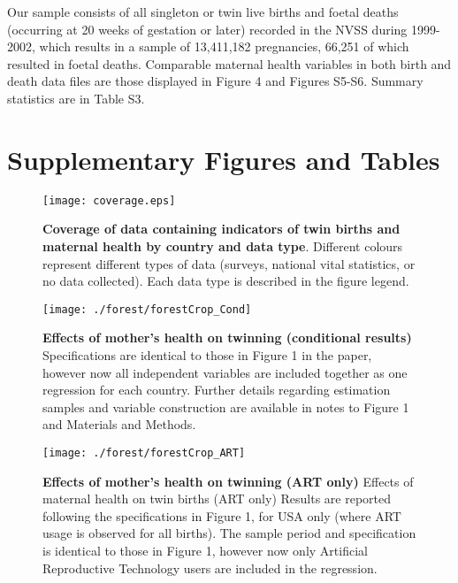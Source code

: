 \documentclass[12pt]{article}
\begin{document}
Our sample consists of all singleton or twin live births and foetal deaths (occurring at 20 weeks of gestation or later) recorded in the NVSS during 1999-2002, which results in a sample of 13,411,182 pregnancies, 66,251 of which resulted in foetal deaths. Comparable maternal health variables in both birth and death data files are those displayed in Figure 4 and Figures S5-S6. %
Summary statistics are in Table S3.


\clearpage
\section{Supplementary Figures and Tables}
\begin{spacing}{1}

\begin{figure}[htpb!]
\texttt{[image: coverage.eps]}
\caption{\textbf{Coverage of data containing indicators of twin births and maternal health by country and data type}. {\footnotesize  Different colours represent different types of data (surveys, national vital statistics, or no data collected).  Each data type is described in the figure legend.}}
\label{fig:twincoverage}
\end{figure}


\clearpage
\begin{figure}
  \begin{center}
    \texttt{[image: ./forest/forestCrop\_Cond]}
  \end{center}
  \caption{\textbf{Effects of mother's health on twinning (conditional results)} {\footnotesize Specifications are identical to those in Figure 1 in the paper, however now all independent variables are included together as one regression for each country. Further details regarding estimation samples and variable construction are available in notes to Figure 1 and Materials and Methods.}}
  \label{fig:fullEstsCond}
\end{figure}
\thispagestyle{empty}
\clearpage

\begin{figure}
  \begin{center}
    \texttt{[image: ./forest/forestCrop\_ART]}
  \end{center}
  \caption{\textbf{Effects of mother's health on twinning (ART only)} {\footnotesize Effects of maternal health on twin births (ART only) Results are reported following the specifications in Figure 1, for USA only (where ART usage is observed for all births). The sample period and specification is identical to those in Figure 1, however now only Artificial Reproductive Technology users are included in the regression.}}
  \label{fig:fullEstsART}
\end{figure}



\end{spacing}
\end{document}
